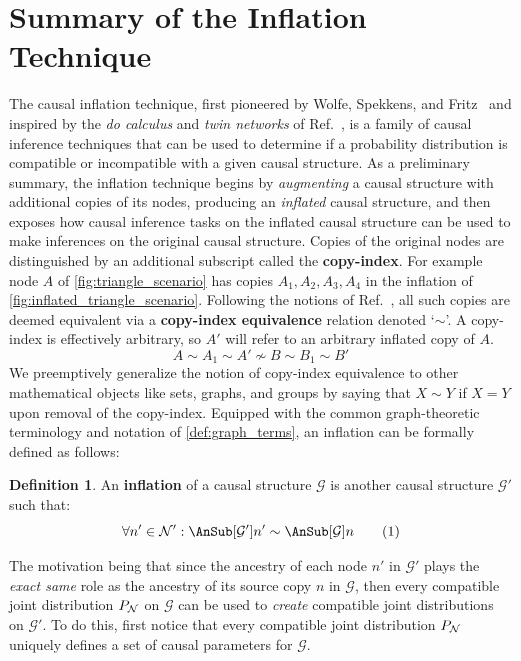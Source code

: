 \documentclass[aps, 10pt, english, twoside, pra, nofootinbib, longbibliography]{revtex4-1}
\theoremstyle{plain}
\theoremstyle{definition}
\newtheorem{definition}[theorem]{Definition}
\theoremstyle{remark}
\newcommand{\graph}{\mathcal{G}}
\newcommand{\nodes}{\mathcal{N}}
\newcommand{\term}[1]{\textcolor{Mahogany}{\textbf{#1}}}
\begin{document}

    \section{Summary of the Inflation Technique}
    \label{sec:summary_inflation}
    The causal inflation technique, first pioneered by Wolfe, Spekkens, and Fritz~\cite{Inflation} and inspired by the \textit{do calculus} and \textit{twin networks} of Ref.~\cite{Pearl_2009}, is a family of causal inference techniques that can be used to determine if a probability distribution is compatible or incompatible with a given causal structure. As a preliminary summary, the inflation technique begins by \textit{augmenting} a causal structure with additional copies of its nodes, producing an \textit{inflated} causal structure, and then exposes how causal inference tasks on the inflated causal structure can be used to make inferences on the original causal structure. Copies of the original nodes are distinguished by an additional subscript called the \term{copy-index}. For example node $A$ of \cref{fig:triangle_scenario} has copies $A_1, A_2, A_3, A_4$ in the inflation of \cref{fig:inflated_triangle_scenario}. Following the notions of Ref.~\cite{Inflation}, all such copies are deemed equivalent via a \term{copy-index equivalence} relation denoted `$\sim$'. A copy-index is effectively arbitrary, so $A'$ will refer to an arbitrary inflated copy of $A$.
    \[ A \sim A_1 \sim A' \not\sim B \sim B_1 \sim B' \]
    We preemptively generalize the notion of copy-index equivalence to other mathematical objects like sets, graphs, and groups by saying that $X \sim Y$ if $X = Y$ upon removal of the copy-index. Equipped with the common graph-theoretic terminology and notation of \cref{def:graph_terms}, an inflation can be formally defined as follows:
    \begin{definition}
        An \term{inflation} of a causal structure $\graph$ is another causal structure $\graph'$ such that:
        \[ \forall n' \in \nodes': \AnSub[\graph']{n'} \sim \AnSub[\graph]{n} \eq \label{eq:inflation_defn}\]
    \end{definition}
    The motivation being that since the ancestry of each node $n'$ in $\graph'$ plays the \textit{exact same} role as the ancestry of its source copy $n$ in $\graph$, then every compatible joint distribution $\prob[\nodes]$ on $\graph$ can be used to \textit{create} compatible joint distributions on $\graph'$. To do this, first notice that every compatible joint distribution $\prob[\nodes]$ uniquely defines a set of causal parameters for $\graph$.
\end{document}
